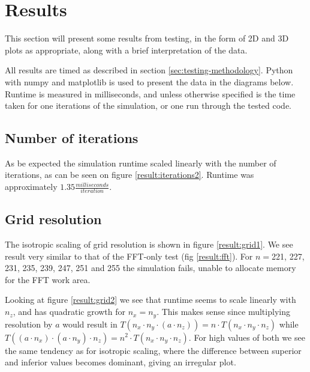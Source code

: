 \chapter{Results}
This section will present some results from testing, in the form of 2D and 3D plots as appropriate, along with a brief
interpretation of the data.

All results are timed as described in section \ref{sec:testing-methodology}. Python with numpy and matplotlib is used to
present the data in the diagrams below. Runtime is measured in milliseconds, and unless otherwise specified is the time
taken for one iterations of the simulation, or one run through the tested code.

\section{Number of iterations}

As be expected the simulation runtime scaled linearly with the number of iterations, as can be seen on figure \ref{result:iterations2}.
Runtime was approximately $1.35\frac{\mathit{milliseconds}}{\mathit{iteration}}$.

\section{Grid resolution}
	
The isotropic scaling of grid resolution is shown in figure \ref{result:grid1}. We see result very similar to that of
the FFT-only test (fig \ref{result:fft}). For $n=$221, 227, 231, 235, 239, 247, 251 and 255 the simulation fails, unable
to allocate memory for the FFT work area.

Looking at figure \ref{result:grid2} we see that runtime seems to scale linearly with $n_z$, and has quadratic growth for $n_x = n_y$.
This makes sense since multiplying resolution by $a$ would result in $T(n_x \cdot n_y \cdot (a\cdot n_z)) = n \cdot T(n_x\cdot n_y \cdot n_z)$
while $T((a \cdot n_x) \cdot (a \cdot n_y) \cdot n_z) = n^2 \cdot T(n_x\cdot n_y \cdot n_z)$. For high values of both 
we see the same tendency as for isotropic scaling, where the difference between superior and inferior values becomes
dominant, giving an irregular plot.

